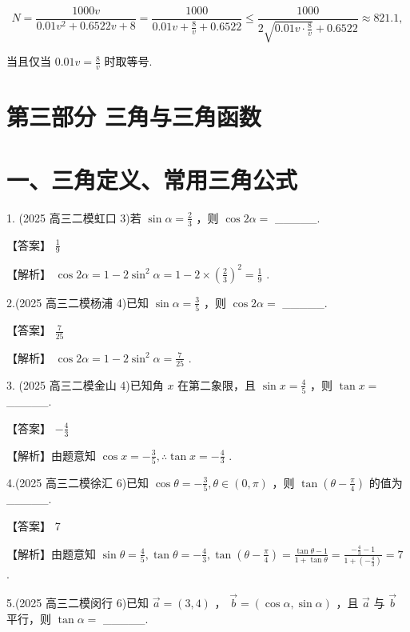 \documentclass[10pt]{article}
\begin{document}
\[
N = \frac{1000v}{{0.01}{v}^{2} + {0.6522v} + 8} = \frac{1000}{{0.01v} + \frac{8}{v} + {0.6522}} \leq  \frac{1000}{2\sqrt{{0.01v} \cdot  \frac{8}{v}} + {0.6522}} \approx  {821.1},
\]

当且仅当 \({0.01v} = \frac{8}{v}\) 时取等号.

\section*{第三部分 三角与三角函数}

\section*{一、三角定义、常用三角公式}

1. (2025 高三二模虹口 3)若 \(\sin \alpha  = \frac{2}{3}\) ，则 \(\cos {2\alpha } =\) \_\_\_\_\_.

【答案】 \(\frac{1}{9}\)

【解析】 \(\cos {2\alpha } = 1 - 2{\sin }^{2}\alpha  = 1 - 2 \times  {\left( \frac{2}{3}\right) }^{2} = \frac{1}{9}\) .

2.(2025 高三二模杨浦 4)已知 \(\sin \alpha  = \frac{3}{5}\) ，则 \(\cos {2\alpha } =\) \_\_\_\_\_.

【答案】 \(\frac{7}{25}\)

【解析】 \(\cos {2\alpha } = 1 - 2{\sin }^{2}\alpha  = \frac{7}{25}\) .

3. (2025 高三二模金山 4)已知角 \(x\) 在第二象限，且 \(\sin x = \frac{4}{5}\) ，则 \(\tan x =\) \_\_\_\_\_.

【答案】 \(- \frac{4}{3}\)

【解析】由题意知 \(\cos x =  - \frac{3}{5},\therefore \tan x =  - \frac{4}{3}\) .

4.(2025 高三二模徐汇 6)已知 \(\cos \theta  =  - \frac{3}{5},\theta  \in  \left( {0,\pi }\right)\) ，则 \(\tan \left( {\theta  - \frac{\pi }{4}}\right)\) 的值为\_\_\_\_\_.

【答案】 7

【解析】由题意知 \(\sin \theta  = \frac{4}{5},\tan \theta  =  - \frac{4}{3},\tan \left( {\theta  - \frac{\pi }{4}}\right)  = \frac{\tan \theta  - 1}{1 + \tan \theta } = \frac{-\frac{4}{3} - 1}{1 + \left( {-\frac{4}{3}}\right) } = 7\) .

5.(2025 高三二模闵行 6)已知 \(\overrightarrow{a} = \left( {3,4}\right)\) ， \(\overrightarrow{b} = \left( {\cos \alpha ,\sin \alpha }\right)\) ，且 \(\overrightarrow{a}\) 与 \(\overrightarrow{b}\) 平行，则 \(\tan \alpha  =\) \_\_\_\_\_.
\end{document}
